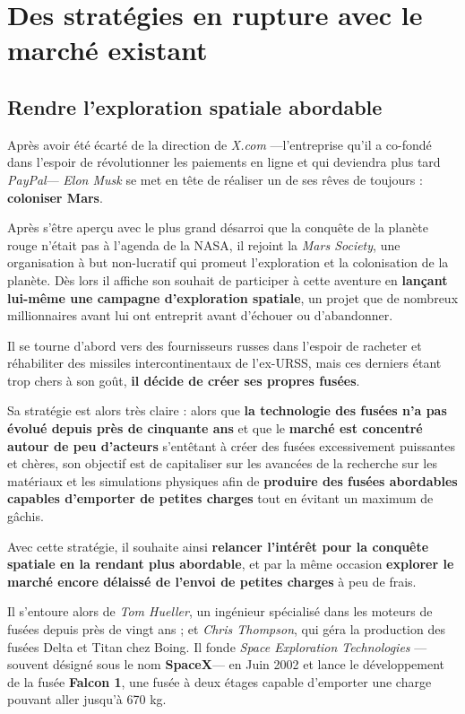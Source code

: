 \chapter{Des stratégies en rupture avec le marché existant}

\section{Rendre l'exploration spatiale abordable}

Après avoir été écarté de la direction de \textit{X.com} ---l'entreprise qu'il a co-fondé dans l'espoir de révolutionner les paiements en ligne et qui deviendra plus tard \textit{PayPal}--- \textit{Elon Musk} se met en tête de réaliser un de ses rêves de toujours : \textbf{coloniser Mars}.

Après s'être aperçu avec le plus grand désarroi que la conquête de la planète rouge n'était pas à l'agenda de la NASA, il rejoint la \textit{Mars Society}, une organisation à but non-lucratif qui promeut l'exploration et la colonisation de la planète. Dès lors il affiche son souhait de participer à cette aventure en \textbf{lançant lui-même une campagne d'exploration spatiale}, un projet que de nombreux millionnaires avant lui ont entreprit avant d'échouer ou d'abandonner.

Il se tourne d'abord vers des fournisseurs russes dans l'espoir de racheter et réhabiliter des missiles intercontinentaux de l'ex-URSS, mais ces derniers étant trop chers à son goût, \textbf{il décide de créer ses propres fusées}.

\vspace{5mm}

Sa stratégie est alors très claire : alors que \textbf{la technologie des fusées n'a pas évolué depuis près de cinquante ans} et que le \textbf{marché est concentré autour de peu d'acteurs} s'entêtant à créer des fusées excessivement puissantes et chères, son objectif est de capitaliser sur les avancées de la recherche sur les matériaux et les simulations physiques afin de \textbf{produire des fusées abordables capables d'emporter de petites charges} tout en évitant un maximum de gâchis.

Avec cette stratégie, il souhaite ainsi \textbf{relancer l'intérêt pour la conquête spatiale en la rendant plus abordable}, et par la même occasion \textbf{explorer le marché encore délaissé de l'envoi de petites charges} à peu de frais.

Il s'entoure alors de \textit{Tom Hueller}, un ingénieur spécialisé dans les moteurs de fusées depuis près de vingt ans ; et \textit{Chris Thompson}, qui géra la production des fusées Delta et Titan chez Boing. Il fonde \textit{Space Exploration Technologies} ---souvent désigné sous le nom \textbf{SpaceX}--- en Juin 2002 et lance le développement de la fusée \textbf{Falcon 1}, une fusée à deux étages capable d'emporter une charge pouvant aller jusqu'à 670 kg.

